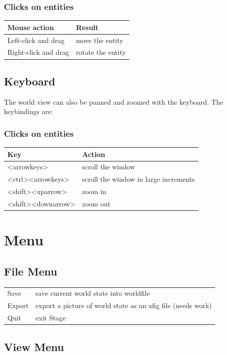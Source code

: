 \documentclass[11pt]{report}
\begin{document}
\subsubsection*{Clicks on entities}
\begin{tabular}{|l|l|}
\hline Mouse action & Result\\\hline
Left-click and drag & move the entity\\
Right-click and drag & rotate the entity\\
\hline
\end{tabular}

\subsection{Keyboard}
The world view can also be panned and zoomed with the keyboard. The
keybindings are:

\subsubsection*{Clicks on entities}
\begin{tabular}{|l|l|}
\hline Key & Action\\ \hline
<arrowkeys>        & scroll the window \\
<ctrl><arrowkeys>  & scroll the window in large increments \\
<shift><uparrow>   & zoom in \\
<shift><downarrow> & zoom out \\
\hline 
\end{tabular}

\section{Menu}

\subsection{File Menu}

\begin{tabular}{|l|l|}
\hline 
Save & save current world state into worldfile\\
Export & export a picture of world state as an xfig file (needs work)\\
Quit & exit Stage\\
\hline
\end{tabular}

\subsection{View Menu}
\end{document}
